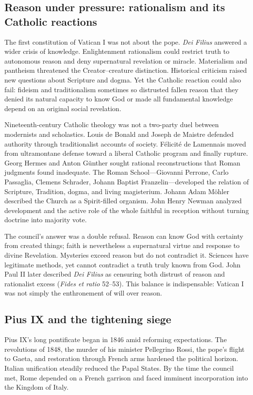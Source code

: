 \subsection{Reason under pressure: rationalism and its Catholic reactions}

The first constitution of Vatican I was not about the pope. \emph{Dei Filius} answered a wider crisis of knowledge. Enlightenment rationalism could restrict truth to autonomous reason and deny supernatural revelation or miracle. Materialism and pantheism threatened the Creator--creature distinction. Historical criticism raised new questions about Scripture and dogma. Yet the Catholic reaction could also fail: fideism and traditionalism sometimes so distrusted fallen reason that they denied its natural capacity to know God or made all fundamental knowledge depend on an original social revelation.

Nineteenth-century Catholic theology was not a two-party duel between modernists and scholastics. Louis de Bonald and Joseph de Maistre defended authority through traditionalist accounts of society. Félicité de Lamennais moved from ultramontane defense toward a liberal Catholic program and finally rupture. Georg Hermes and Anton Günther sought rational reconstructions that Roman judgments found inadequate. The Roman School—Giovanni Perrone, Carlo Passaglia, Clemens Schrader, Johann Baptist Franzelin—developed the relation of Scripture, Tradition, dogma, and living magisterium. Johann Adam Möhler described the Church as a Spirit-filled organism. John Henry Newman analyzed development and the active role of the whole faithful in reception without turning doctrine into majority vote.

The council's answer was a double refusal. Reason can know God with certainty from created things; faith is nevertheless a supernatural virtue and response to divine Revelation. Mysteries exceed reason but do not contradict it. Sciences have legitimate methods, yet cannot contradict a truth truly known from God. John Paul II later described \emph{Dei Filius} as censuring both distrust of reason and rationalist excess (\emph{Fides et ratio} 52--53). This balance is indispensable: Vatican I was not simply the enthronement of will over reason.

\subsection{Pius IX and the tightening siege}

Pius IX's long pontificate began in 1846 amid reforming expectations. The revolutions of 1848, the murder of his minister Pellegrino Rossi, the pope's flight to Gaeta, and restoration through French arms hardened the political horizon. Italian unification steadily reduced the Papal States. By the time the council met, Rome depended on a French garrison and faced imminent incorporation into the Kingdom of Italy.

